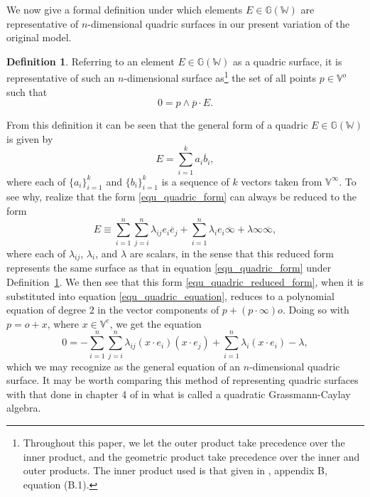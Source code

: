 \documentclass{birkjour}
\theoremstyle{definition}
\newtheorem{defn}[thm]{Definition}
\theoremstyle{remark}
\numberwithin{equation}{section}
\newcommand{\G}{\mathbb{G}}
\newcommand{\V}{\mathbb{V}}
\newcommand{\W}{\mathbb{W}}
\newcommand{\nvao}{o}
\newcommand{\nvai}{\infty}
\newcommand{\nvaib}{\overline{\infty}}
\begin{document}
We now give a formal definition under which elements $E\in\G(\W)$
are representative of $n$-dimensional quadric surfaces in our present variation
of the original model.
\begin{defn}\label{def_quadric}
Referring to an element $E\in\G(\W)$ as a quadric surface, it is representative of such an $n$-dimensional surface as\footnote{Throughout this paper, we let the outer product take precedence
over the inner product, and the geometric product take precedence over the inner and
outer products.  The inner product used is that given in \cite{Dorst07}, appendix B,
equation (B.1).} the set of all points $p\in\V^o$ such that
\begin{equation}\label{equ_quadric_equation}
0 = p\wedge\overline{p}\cdot E.
\end{equation}
\end{defn}
From this definition it can be seen that the general form of a quadric $E\in\G(\W)$ is given by
\begin{equation}\label{equ_quadric_form}
E = \sum_{i=1}^k a_i\overline{b}_i,
\end{equation}
where each of $\{a_i\}_{i=1}^k$ and $\{b_i\}_{i=1}^k$ is a sequence of $k$ vectors
taken from $\V^\nvai$.  To see why, realize that the form \eqref{equ_quadric_form} can
always be reduced to the form
\begin{equation}\label{equ_quadric_reduced_form}
E \equiv \sum_{i=1}^n\sum_{j=i}^n\lambda_{ij}e_i\overline{e}_j+
\sum_{i=1}^n\lambda_i e_i\nvaib+
\lambda\nvai\nvaib,
\end{equation}
where each of $\lambda_{ij}$, $\lambda_i$, and $\lambda$ are scalars, in the
sense that this reduced form represents the same surface as that in equation \eqref{equ_quadric_form}
under Definition~\ref{def_quadric}.
We then see that this form \eqref{equ_quadric_reduced_form}, when it is
substituted into equation \eqref{equ_quadric_equation}, reduces to a polynomial
equation of degree 2 in the vector components of $p+(p\cdot\nvai)\nvao$.
Doing so with $p=\nvao+x$, where $x\in\V^e$, we get the equation
\begin{equation}\label{equ_quadric_polynomial_equation}
0 = -\sum_{i=1}^n\sum_{j=i}^n\lambda_{ij}(x\cdot e_i)(x\cdot e_j)
+\sum_{i=1}^n\lambda_i(x\cdot e_i) - \lambda,
\end{equation}
which we may recognize as the general equation of an $n$-dimensional quadric surface.
It may be worth comparing this method of representing quadric surfaces with that done
in chapter 4 of \cite{Li08} in what is called a quadratic Grassmann-Caylay algebra.
\end{document}
